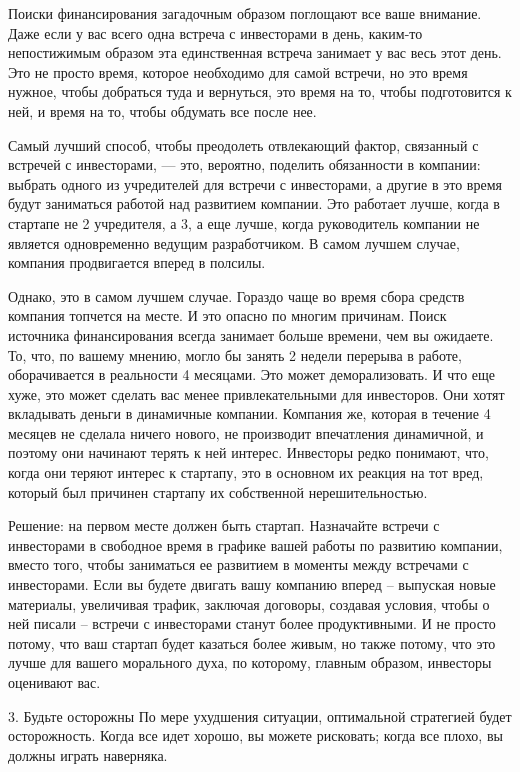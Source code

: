 \documentclass[ebook,12pt,oneside,openany]{memoir}
\begin{document}
Поиски финансирования загадочным образом поглощают все ваше внимание.
Даже если у вас всего одна встреча с инвесторами в день, каким-то
непостижимым образом эта единственная встреча занимает у вас весь этот
день. Это не просто время, которое необходимо для самой встречи, но
это время нужное, чтобы добраться туда и вернуться, это время на то,
чтобы подготовится к ней, и время на то, чтобы обдумать все после нее.

Самый лучший способ, чтобы преодолеть отвлекающий фактор, связанный с
встречей с инвесторами, — это, вероятно, поделить обязанности в
компании: выбрать одного из учредителей для встречи с инвесторами, а
другие в это время будут заниматься работой над развитием компании.
Это работает лучше, когда в стартапе не 2 учредителя, а 3, а еще
лучше, когда руководитель компании не является одновременно ведущим
разработчиком. В самом лучшем случае, компания продвигается вперед в
полсилы.

Однако, это в самом лучшем случае. Гораздо чаще во время сбора средств
компания топчется на месте. И это опасно по многим причинам. Поиск
источника финансирования всегда занимает больше времени, чем вы
ожидаете. То, что, по вашему мнению, могло бы занять 2 недели перерыва
в работе, оборачивается в реальности 4 месяцами. Это может
деморализовать. И что еще хуже, это может сделать вас менее
привлекательными для инвесторов. Они хотят вкладывать деньги в
динамичные компании. Компания же, которая в течение 4 месяцев не
сделала ничего нового, не производит впечатления динамичной, и поэтому
они начинают терять к ней интерес. Инвесторы редко понимают, что,
когда они теряют интерес к стартапу, это в основном их реакция на тот
вред, который был причинен стартапу их собственной нерешительностью.

Решение: на первом месте должен быть стартап. Назначайте встречи с
инвесторами в свободное время в графике вашей работы по развитию
компании, вместо того, чтобы заниматься ее развитием в моменты между
встречами с инвесторами. Если вы будете двигать вашу компанию вперед –
выпуская новые материалы, увеличивая трафик, заключая договоры,
создавая условия, чтобы о ней писали – встречи с инвесторами станут
более продуктивными. И не просто потому, что ваш стартап будет
казаться более живым, но также потому, что это лучше для вашего
морального духа, по которому, главным образом, инвесторы оценивают
вас.

3. Будьте осторожны По мере ухудшения ситуации, оптимальной стратегией
будет осторожность. Когда все идет хорошо, вы можете рисковать; когда
все плохо, вы должны играть наверняка.
\end{document}
